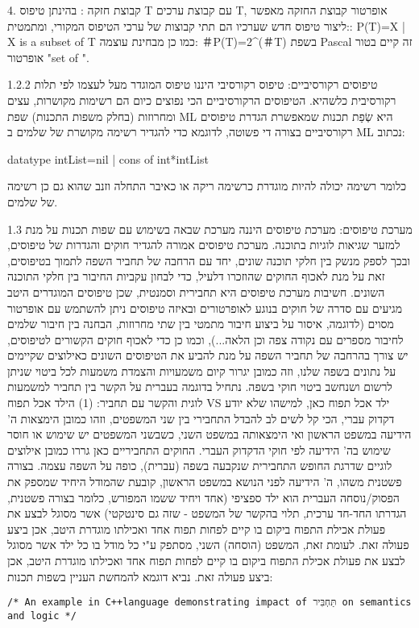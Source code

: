 \begin{טבלא}[!htbp]
      4. קבוצת חזקה :
      בהינתן טיפוס T עם קבוצת ערכים T, אופרטור קבוצת החזקה מאפשר ליצור טיפוס חדש שערכיו הם תתי קבוצות של ערכי הטיפוס המקורי, ומתמטית::
      P(T)={X | X is a subset of T}
      כמו כן מבחינת עוצמה:
        ＃P(T)=2^(＃T)
      בשפת Pascal זה קיים בטור אופרטור "set of ".

      1.2.2 טיפוסים רקורסיביים:
      טיפוס רקורסיבי היננו טיפוס המוגדר מעל לעצמו לפי תלות רקורסיבית כלשהיא.
      הטיפוסים הרקורסיביים הכי נפוצים כיום הם רשימות מקושרות, עצים ומחרוזות (בחלק משפות התכנות)
      שפת ML היא שְׂפַת תכנות שמאפשרת הגדרת טיפוסים רקורסיביים בצורה די פשוטה, לדוגמא כדי להגדיר רשימה מקושרת של שלמים ב ML נכתוב:

      datatype intList=nil | cons of int*intList

      כלומר רשימה יכולה להיות מוגדרת כרשימה ריקה או כאיבר התחלה וזנב שהוא גם כן רשימה של שלמים.

      1.3 מערכת טיפוסים:
      מערכת טיפוסים היננה מערכת שבאה בשימוש עם שפות תכנות על מנת למזער שגיאות לוגיות
      בתוכנה. מערכת טיפוסים אמורה להגדיר חוקים והגדרות של טיפוסים, ובכך לספק מנשק בין
      חלקי תוכנה שונים, יחד עם הרחבה של תחביר השפה לתמוך בטיפוסים, זאת על מנת לאכוף
      החוקים שהוזכרו דלעיל, כדי לבחון עקביות החיבור בין חלקי התוכנה השונים. חשיבות
      מערכת טיפוסים היא תחבירית וסמנטית, שכן טיפוסים המוגדרים היטב מגיעים עם סדרה של
      חוקים בנוגע לאופרטורים ובאיזה טיפוסים ניתן להשתמש עם אופרטור מסוים (לדוגמה,
      איסור על ביצוע חיבור מתמטי בין שתי מחרוזות, הבחנה בין חיבור שלמים לחיבור מספרים
      עם נקודה צפה וכן הלאה...), וכמו כן כדי לאכוף חוקים הקשורים לטיפוסים, יש צורך
      בהרחבה של תחביר השפה על מנת להביע את הטיפוסים השונים כאילוצים שקיימים על נתונים
      בשפה שלנו, וזה כמובן יגרור קיום משמעויות והצמדת משמעות לכל ביטוי שניתן לרשום
      ושנחשב ביטוי חוקי בשפה. נתחיל בדוגמה בעברית על הקשר בין תחביר למשמעות לוגית
      והקשר עם תחביר:
      (1) הילד אכל תפוח VS ילד אכל תפוח כאן, למישהו שלא יודע דקדוק עברי, הכי
      קל לשים לב להבדל התחבירי בין שני המשפטים, וזהו כמובן הימצאות ה' הידיעה במשפט
      הראשון ואי הימצאותה במשפט השני, כשבשני המשפטים יש שימוש או חוסר שימוש בה'
      הידיעה לפי חוקי הדקדוק העברי. החוקים התחביריים כאן גררו כמובן אילוצים לוגיים
      שדרגת החופש התחבירית שנקבעה בשפה (עברית), כופה על השפה עצמה. בצורה פשטנית משהו,
      ה' הידיעה לפני הנושא במשפט הראשון, קובעת שהמודל היחיד שמספק את הפסוק/נוסחה
      העברית הוא ילד ספציפי (אחד ויחיד ששמו המפורש, כלומר בצורה פשטנית, הגדרתו החד-חד
      ערכית, תלוי בהקשר של המשפט - שזה גם סינטקטי) אשר מסוגל לבצע את פעולת אכילת
      התפוח ביקום בו קיים לפחות תפוח אחד ואכילתו מוגדרת היטב, אכן ביצע פעולה זאת.
      לעומת זאת, המשפט (הוסחה) השני, מסתפק ע"י כל מודל בו כל ילד אשר מסוגל לבצע את
      פעולת אכילת התפוח ביקום בו קיים לפחות תפוח אחד ואכילתו מוגדרת היטב, אכן ביצע
      פעולה זאת.
      נביא דוגמא להמחשת העניין בשפות תכנות:
\begin{verbatim}
/* An example in C++language demonstrating impact of תַּחְבִּיר on semantics and logic */


\end{verbatim}
\end{טבלא}
